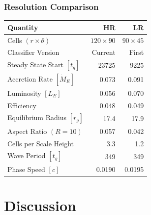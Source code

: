 	\begin{frame}
		\frametitle{Resolution Comparison}
		\centering
		\renewcommand{\arraystretch}{0.92}
		\begin{tabular}{l r r}
			\toprule
			\bfseries{Quantity} & \bfseries{HR} & \bfseries{LR} \\
			\midrule
			Cells $(r \times \theta)$          & $120 \times 90$ & $90 \times 45$ \\
			Classifier Version                 & Current         & First \\
			Steady State Start $[t_g]$      & \num{23725}     & \num{9225} \\
			Accretion Rate $[\dot M_E]$     & \num{0.073}     & \num{0.091} \\
			Luminosity $[L_E]$              & \num{0.056}     & \num{0.070} \\
			Efficiency                         & \num{0.048}     & \num{0.049} \\
			Equilibrium Radius $[r_g]$      & \num{17.4}      & \num{17.9} \\
			Aspect Ratio $(R = 10)$            & \num{0.057}     & \num{0.042} \\
			Cells per Scale Height             & \num{3.3}       & \num{1.2} \\
			Wave Period $[t_g]$             & \num{349}       & \num{349} \\
			Phase Speed $[c]$               & \num{0.0190}    & \num{0.0195} \\
			\bottomrule
		\end{tabular}
	\end{frame}

	\section{Discussion}

